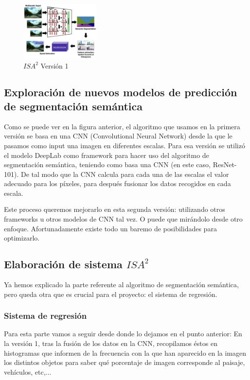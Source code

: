 \documentclass[12pt,oneside,a4paper]{article}
\begin{document}
\begin{figure}[h]
  \centering
  \includegraphics[width=4cm]{figuras/Figura_Esquema_ISA2_Version_1_SegSem.eps}
  \caption{$ISA^2$ Versión 1}
\end{figure}

\subsection{Exploración de nuevos modelos de predicción de segmentación semántica}

Como se puede ver en la figura anterior, el algoritmo que usamos en la primera versión se basa en una CNN (Convolutional Neural Network) desde la que le pasamos como input una imagen en diferentes escalas. Para esa versión se utilizó el modelo DeepLab como framework para hacer uso del algoritmo de segmentación semántica, teniendo como basa una CNN (en este caso, ResNet-101). De tal modo que la CNN calcula para cada una de las escalas el valor adecuado para los píxeles, para después fusionar los datos recogidos en cada escala.

Este proceso queremos mejorarlo en esta segunda versión: utilizando otros frameworks u otros modelos de CNN tal vez. O puede que mirándolo desde otro enfoque. Afortunadamente existe todo un baremo de posibilidades para optimizarlo\cite{segsem}. 
\subsection{Elaboración de sistema $ISA^2$}

Ya hemos explicado la parte referente al algoritmo de segmentación semántica, pero queda otra que es crucial para el proyecto: el sistema de regresión.
\subsubsection{Sistema de regresión}

Para esta parte vamos a seguir desde donde lo dejamos en el punto anterior: En la versión 1, tras la fusión de los datos en la CNN, recopilamos éstos en histogramas que informen de la frecuencia con la que han aparecido en la imagen los distintos objetos para saber qué porcentaje de imagen corresponde al paisaje, vehículos, etc,... 
\end{document}

